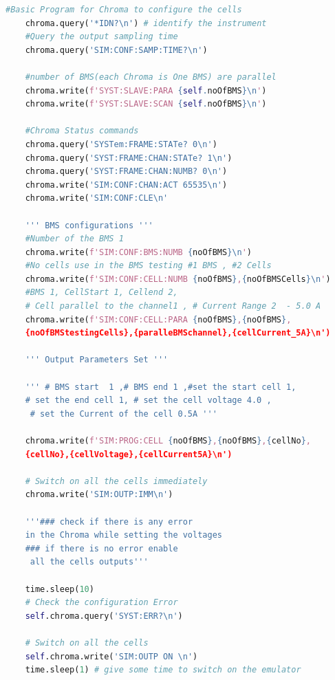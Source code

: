 \begin{lstlisting}[language=Python, caption=Basic BMS Program for Chroma]
    #Basic Program for Chroma to configure the cells
    chroma.query('*IDN?\n') # identify the instrument
    #Query the output sampling time
    chroma.query('SIM:CONF:SAMP:TIME?\n') 

    #number of BMS(each Chroma is One BMS) are parallel
    chroma.write(f'SYST:SLAVE:PARA {self.noOfBMS}\n')
    chroma.write(f'SYST:SLAVE:SCAN {self.noOfBMS}\n')

    #Chroma Status commands
    chroma.query('SYSTem:FRAME:STATe? 0\n')
    chroma.query('SYST:FRAME:CHAN:STATe? 1\n')
    chroma.query('SYST:FRAME:CHAN:NUMB? 0\n')
    chroma.write('SIM:CONF:CHAN:ACT 65535\n')
    chroma.write('SIM:CONF:CLE\n'

    ''' BMS configurations '''
    #Number of the BMS 1
    chroma.write(f'SIM:CONF:BMS:NUMB {noOfBMS}\n')
    #No cells use in the BMS testing #1 BMS , #2 Cells 
    chroma.write(f'SIM:CONF:CELL:NUMB {noOfBMS},{noOfBMSCells}\n')
    #BMS 1, CellStart 1, Cellend 2, 
    # Cell parallel to the channel1 , # Current Range 2  - 5.0 A
    chroma.write(f'SIM:CONF:CELL:PARA {noOfBMS},{noOfBMS},
    {noOfBMStestingCells},{paralleBMSchannel},{cellCurrent_5A}\n') 

    ''' Output Parameters Set '''

    ''' # BMS start  1 ,# BMS end 1 ,#set the start cell 1, 
    # set the end cell 1, # set the cell voltage 4.0 ,
     # set the Current of the cell 0.5A '''

    chroma.write(f'SIM:PROG:CELL {noOfBMS},{noOfBMS},{cellNo},
    {cellNo},{cellVoltage},{cellCurrent5A}\n') 

    # Switch on all the cells immediately
    chroma.write('SIM:OUTP:IMM\n') 

    '''### check if there is any error 
    in the Chroma while setting the voltages 
    ### if there is no error enable
     all the cells outputs''' 

    time.sleep(10)
    # Check the configuration Error 
    self.chroma.query('SYST:ERR?\n')

    # Switch on all the cells
    self.chroma.write('SIM:OUTP ON \n')  
    time.sleep(1) # give some time to switch on the emulator 

\end{lstlisting}

